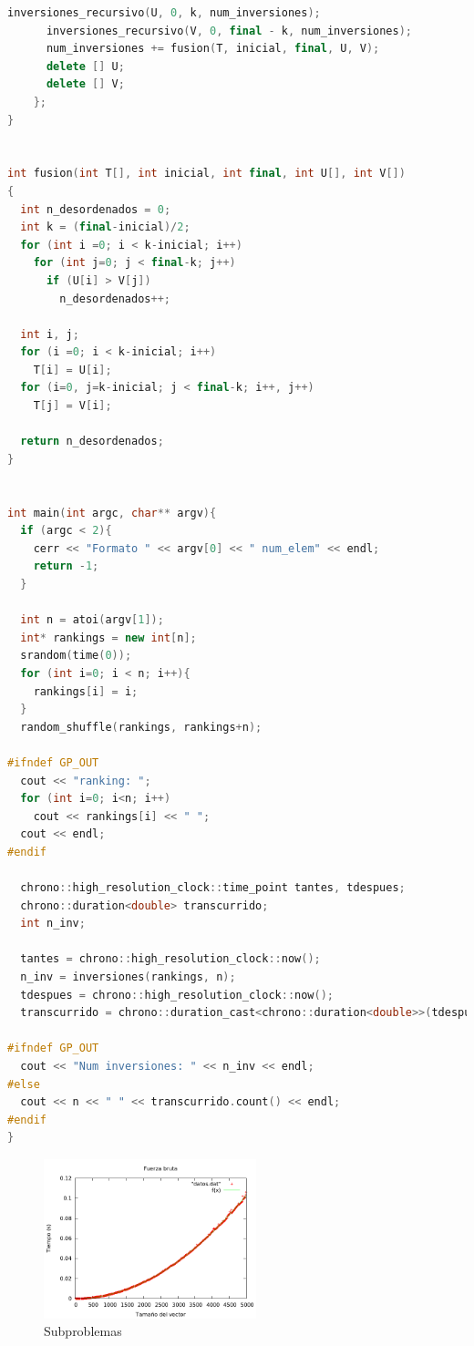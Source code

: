 \begin{lstlisting}[language=c++]
      inversiones_recursivo(U, 0, k, num_inversiones);
      inversiones_recursivo(V, 0, final - k, num_inversiones);
      num_inversiones += fusion(T, inicial, final, U, V);
      delete [] U;
      delete [] V;
    };
}


int fusion(int T[], int inicial, int final, int U[], int V[])
{
  int n_desordenados = 0;
  int k = (final-inicial)/2;
  for (int i =0; i < k-inicial; i++)
    for (int j=0; j < final-k; j++)
      if (U[i] > V[j])
        n_desordenados++;

  int i, j;
  for (i =0; i < k-inicial; i++)
    T[i] = U[i];
  for (i=0, j=k-inicial; j < final-k; i++, j++)
    T[j] = V[i];

  return n_desordenados;
}


int main(int argc, char** argv){
  if (argc < 2){
    cerr << "Formato " << argv[0] << " num_elem" << endl;
    return -1;
  }

  int n = atoi(argv[1]);
  int* rankings = new int[n];
  srandom(time(0));
  for (int i=0; i < n; i++){
    rankings[i] = i;
  }
  random_shuffle(rankings, rankings+n);

#ifndef GP_OUT
  cout << "ranking: ";
  for (int i=0; i<n; i++)
    cout << rankings[i] << " ";
  cout << endl;
#endif

  chrono::high_resolution_clock::time_point tantes, tdespues;
  chrono::duration<double> transcurrido;
  int n_inv;

  tantes = chrono::high_resolution_clock::now();
  n_inv = inversiones(rankings, n);
  tdespues = chrono::high_resolution_clock::now();
  transcurrido = chrono::duration_cast<chrono::duration<double>>(tdespues - tantes);

#ifndef GP_OUT
  cout << "Num inversiones: " << n_inv << endl;
#else
  cout << n << " " << transcurrido.count() << endl;
#endif
}
\end{lstlisting}


\begin{figure}[htb] 
\centering
	\includegraphics[width=0.55\textwidth]{../Opcional/Graficas/fuerza_bruta_bruno.png}
	\caption{Subproblemas} 
	\label{fig:perros} 
\end{figure}

